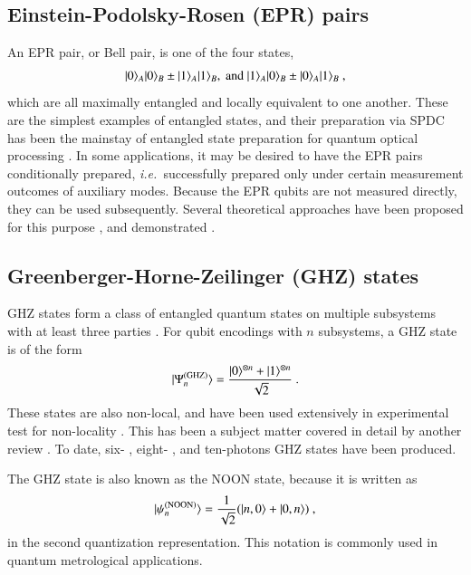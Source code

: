 \documentclass[times,final]{elsarticle}
\newcommand{\ket}[1]{|#1\rangle}
\begin{document}
\subsection{Einstein-Podolsky-Rosen (EPR) pairs}

An EPR pair, or Bell pair, is one of the four states,
\begin{align}
\ket{0}_A\ket{0}_B \pm \ket{1}_A\ket{1}_B, \ {\rm and} \ \ket{1}_A\ket{0}_B \pm \ket{0}_A\ket{1}_B \ ,
\end{align}
which are all maximally entangled and locally equivalent to one another. These are the simplest examples of entangled states, and their preparation via SPDC has been the mainstay of entangled state preparation for quantum optical processing \cite{bib:Kim01}.
In some applications, it may be desired to have the EPR pairs conditionally prepared, {\it i.e.~}successfully prepared only under certain measurement outcomes of auxiliary modes. Because the EPR qubits are not measured directly, they can be used subsequently. Several theoretical approaches have been proposed for this purpose \cite{bib:Pittman03,bib:Sliwa03,bib:Walther07}, and demonstrated \cite{bib:Wagenknecht10,bib:Barz10}.

\subsection{Greenberger-Horne-Zeilinger (GHZ) states}

GHZ states form a class of entangled quantum states on multiple subsystems with at least three parties \cite{bib:GHZ89}. For qubit encodings with $n$ subsystems, a GHZ state is of the form
\begin{align}
\ket{\Psi_{n}^{\rm (GHZ)}}=\frac{\ket{0}^{\otimes n}+\ket{1}^{\otimes n}}{\sqrt{2}} \ .
\end{align}
These states are also non-local, and have been used extensively in experimental test for non-locality \cite{bib:JW00,bib:Zhang15}. This has been a subject matter covered in detail by another review \cite{bib:JW12}. To date, six- \cite{bib:Lu06,bib:Zhang15}, eight- \cite{bib:Huang11,bib:Yao12}, and ten-photons \cite{bib:WangChen16,bib:Chen17} GHZ states have been produced.

The GHZ state is also known as the NOON state, because it is written as
\begin{align}
\ket{\psi^{\rm (NOON)}_n}=\frac{1}{\sqrt{2}}(\ket{n,0}+\ket{0,n})\ ,
\end{align}
in the second quantization representation. This notation is commonly used in quantum metrological applications.
\end{document}
